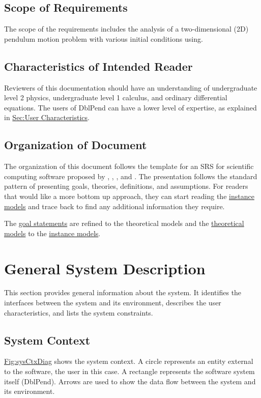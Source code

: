 \documentclass[12pt]{article}
\begin{document}
{\subsection{Scope of Requirements}
\label{Sec:ReqsScope}
The scope of the requirements includes the analysis of a two-dimensional (2D) pendulum motion problem with various initial conditions using.

\subsection{Characteristics of Intended Reader}
\label{Sec:ReaderChars}
Reviewers of this documentation should have an understanding of undergraduate level 2 physics, undergraduate level 1 calculus, and ordinary differential equations. The users of DblPend can have a lower level of expertise, as explained in \hyperref[Sec:UserChars]{Sec:User Characteristics}.

\subsection{Organization of Document}
\label{Sec:DocOrg}
The organization of this document follows the template for an SRS for scientific computing software proposed by \cite{koothoor2013}, \cite{smithLai2005}, \cite{smithEtAl2007}, and \cite{smithKoothoor2016}. The presentation follows the standard pattern of presenting goals, theories, definitions, and assumptions. For readers that would like a more bottom up approach, they can start reading the \hyperref[Sec:IMs]{instance models} and trace back to find any additional information they require.

The \hyperref[Sec:GoalStmt]{goal statements} are refined to the theoretical models and the \hyperref[Sec:TMs]{theoretical models} to the \hyperref[Sec:IMs]{instance models}.

\section{General System Description}
\label{Sec:GenSysDesc}
This section provides general information about the system. It identifies the interfaces between the system and its environment, describes the user characteristics, and lists the system constraints.

\subsection{System Context}
\label{Sec:SysContext}
\hyperref[Figure:sysCtxDiag]{Fig:sysCtxDiag} shows the system context. A circle represents an entity external to the software, the user in this case. A rectangle represents the software system itself (DblPend). Arrows are used to show the data flow between the system and its environment.

}
\end{document}
